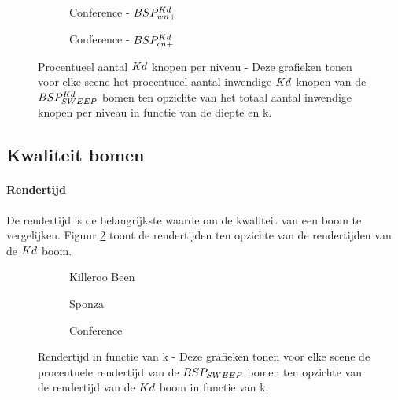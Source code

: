 \begin{figure}
\begin{subfigure}[t]{0.32\linewidth}
\centering
{}
\caption{Conference - $BSP^{Kd}_{wn+}$}
\end{subfigure}
\begin{subfigure}[t]{0.32\linewidth}
\centering
{}
\caption{Conference - $BSP^{Kd}_{cn+}$}
\end{subfigure}
\caption[Procentueel aantal $\symKd$ knopen per niveau]{Procentueel aantal $\symKd$ knopen per niveau - \small Deze grafieken tonen voor elke scene het procentueel aantal inwendige $\symKd$ knopen van de $BSP^{Kd}_{SWEEP}$ bomen ten opzichte van het totaal aantal inwendige knopen per niveau in functie van de diepte en k.}
\label{fig:k-kd-knopen-diepte}
\end{figure}

\subsection{Kwaliteit bomen}
\label{h5-richtingen-kwaliteit}
\paragraph{Rendertijd}
De rendertijd is de belangrijkste waarde om de kwaliteit van een boom te vergelijken. Figuur \ref{fig:k-rendertijd} toont de rendertijden ten opzichte van de rendertijden van de $\symKd$ boom.
\begin{figure}
  \centering
  \begin{subfigure}[t]{.32\linewidth}
    \centering
{}
\caption{Killeroo Been}
  \end{subfigure}
  \begin{subfigure}[t]{.32\linewidth}
    \centering
{}
\caption{Sponza}
\end{subfigure}
\begin{subfigure}[t]{.32\linewidth}
  \centering
{}
\caption{Conference}
\end{subfigure}
\caption[Rendertijd in functie van k]{Rendertijd in functie van k - \small Deze grafieken tonen voor elke scene de procentuele rendertijd van de $BSP_{SWEEP}$ bomen ten opzichte van de rendertijd van de $\symKd$ boom in functie van k.}
\label{fig:k-rendertijd}
\end{figure}

